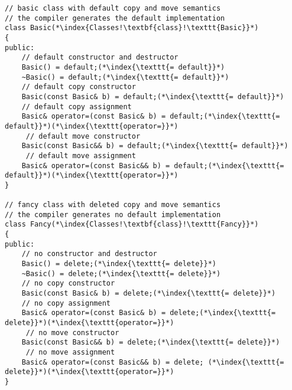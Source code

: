 \documentclass[10pt]{article}
\begin{document}
\begin{lstlisting}
// basic class with default copy and move semantics
// the compiler generates the default implementation
class Basic(*\index{Classes!\textbf{class}!\texttt{Basic}}*)
{
public:
    // default constructor and destructor
    Basic() = default;(*\index{\texttt{= default}}*)
    ~Basic() = default;(*\index{\texttt{= default}}*)
    // default copy constructor
    Basic(const Basic& b) = default;(*\index{\texttt{= default}}*)
    // default copy assignment
    Basic& operator=(const Basic& b) = default;(*\index{\texttt{= default}}*)(*\index{\texttt{operator=}}*)
     // default move constructor
    Basic(const Basic&& b) = default;(*\index{\texttt{= default}}*)
     // default move assignment
    Basic& operator=(const Basic&& b) = default;(*\index{\texttt{= default}}*)(*\index{\texttt{operator=}}*)
}

// fancy class with deleted copy and move semantics
// the compiler generates no default implementation
class Fancy(*\index{Classes!\textbf{class}!\texttt{Fancy}}*)
{
public:
    // no constructor and destructor
    Basic() = delete;(*\index{\texttt{= delete}}*)
    ~Basic() = delete;(*\index{\texttt{= delete}}*)
    // no copy constructor
    Basic(const Basic& b) = delete;(*\index{\texttt{= delete}}*)
    // no copy assignment
    Basic& operator=(const Basic& b) = delete;(*\index{\texttt{= delete}}*)(*\index{\texttt{operator=}}*)
     // no move constructor
    Basic(const Basic&& b) = delete;(*\index{\texttt{= delete}}*)
     // no move assignment
    Basic& operator=(const Basic&& b) = delete; (*\index{\texttt{= delete}}*)(*\index{\texttt{operator=}}*)
}
\end{lstlisting}

%
%
\end{document}
